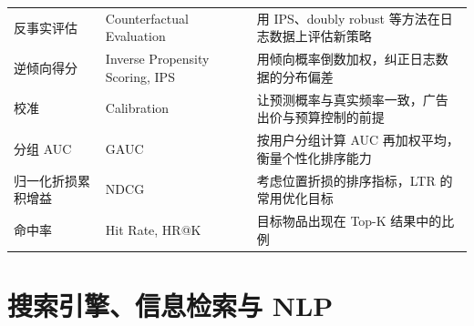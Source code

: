 \begin{xltabular}{\textwidth}{L{3.0cm} L{3.6cm} Y}
反事实评估 & Counterfactual Evaluation & 用 IPS、doubly robust 等方法在日志数据上评估新策略 \\
逆倾向得分 & Inverse Propensity Scoring, IPS & 用倾向概率倒数加权，纠正日志数据的分布偏差 \\
校准 & Calibration & 让预测概率与真实频率一致，广告出价与预算控制的前提 \\
分组 AUC & GAUC & 按用户分组计算 AUC 再加权平均，衡量个性化排序能力 \\
归一化折损累积增益 & NDCG & 考虑位置折损的排序指标，LTR 的常用优化目标 \\
命中率 & Hit Rate, HR@K & 目标物品出现在 Top-K 结果中的比例 \\
\end{xltabular}

\section{搜索引擎、信息检索与 NLP}


